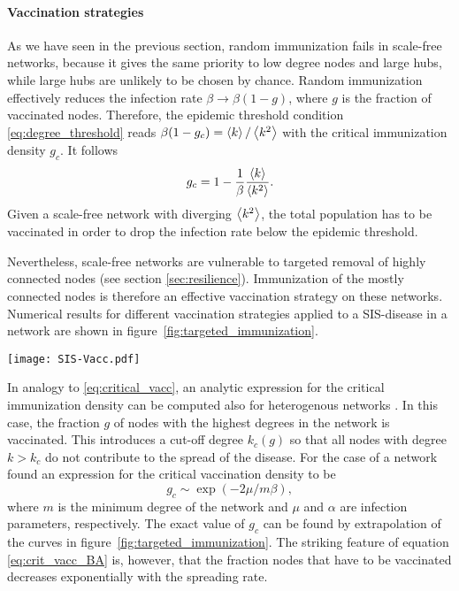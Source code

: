 \paragraph{Vaccination strategies\color{Cayenne}{.}}
As we have seen in the previous section, random immunization fails in scale-free networks, because it gives the same priority to low degree nodes and large hubs, while large hubs are unlikely to be chosen by chance.
Random immunization effectively reduces the infection rate $\beta \rightarrow \beta (1-g)$, where $g$ is the fraction of vaccinated nodes.
Therefore, the epidemic threshold condition \eqref{eq:degree_threshold} reads $\beta (1-g_c)=\left< k \right>/\left< k^2 \right>$ with the critical immunization density $g_c$.
It follows
\begin{equation}\label{eq:critical_vacc}
g_c=1- \frac{1}{\beta } \frac{\left< k \right>}{\left< k^2 \right>}.
\end{equation}
Given a scale-free network with diverging $\left< k^2 \right>$, the total population has to be vaccinated in order to drop the infection rate below the epidemic threshold.

Nevertheless, scale-free networks are vulnerable to targeted removal of highly connected nodes (see section \ref{sec:resilience}).
Immunization of the mostly connected nodes is therefore an effective vaccination strategy on these networks.
Numerical results for different vaccination strategies applied to a SIS-disease in a \BA network are shown in figure~\ref{fig:targeted_immunization}.
%
\begin{SCfigure}
\texttt{[image: SIS-Vacc.pdf]}
\caption{Targeted and random vaccination for an SIS disease in a \BA network with $10^5$ nodes and $m=4$.
Infection parameters $\beta / \mu =2$.}
\label{fig:targeted_immunization}
\end{SCfigure}
%

In analogy to \eqref{eq:critical_vacc}, an analytic expression for the critical immunization density can be computed also for heterogenous networks \citep{PastorSat:immunization}.
In this case, the fraction $g$ of nodes with the highest degrees in the network is vaccinated.
This introduces a cut-off degree $k_c(g)$ so that all nodes with degree $k>k_c$ do not contribute to the spread of the disease.
For the case of a \BA network \citeauthor{PastorSat:immunization} found an expression for the critical vaccination density to be
\begin{equation}\label{eq:crit_vacc_BA}
g_c \sim \exp (-2\mu / m\beta ),
\end{equation}
where $m$ is the minimum degree of the network and $\mu $ and $\alpha $ are infection parameters, respectively.
The exact value of $g_c$ can be found by extrapolation of the curves in figure~\ref{fig:targeted_immunization}.
The striking feature of equation \eqref{eq:crit_vacc_BA} is, however, that the fraction nodes that have to be vaccinated decreases exponentially with the spreading rate.

